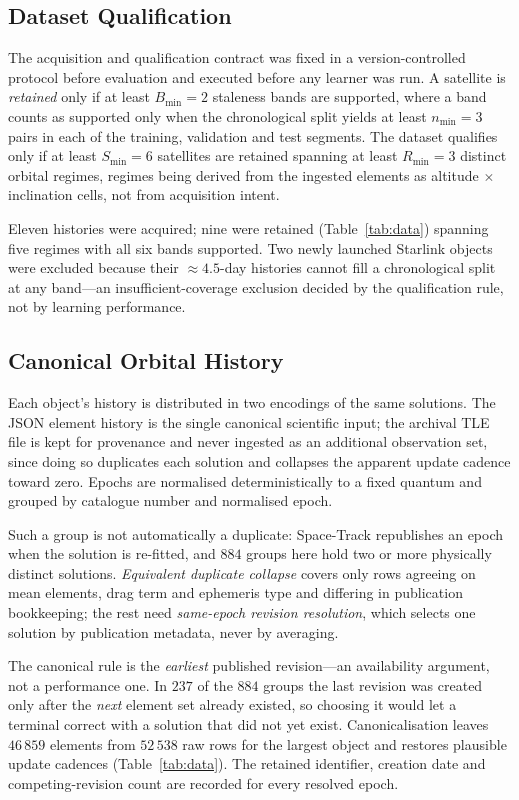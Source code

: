 \documentclass[conference]{IEEEtran}
\begin{document}
\subsection{Dataset Qualification}
\label{sec:qual}
The acquisition and qualification contract was fixed in a version-controlled
protocol before evaluation and executed before any learner was run. A satellite is \emph{retained} only if at least
$B_{\min}=2$ staleness bands are supported, where a band counts as supported
only when the chronological split yields at least $n_{\min}=3$ pairs in each of
the training, validation and test segments. The dataset qualifies only if at
least $S_{\min}=6$ satellites are retained spanning at least $R_{\min}=3$
distinct orbital regimes, regimes being derived from the ingested elements as
altitude$\,\times\,$inclination cells, not from acquisition intent.

Eleven histories were acquired; nine were retained (Table~\ref{tab:data})
spanning five regimes with all six bands supported. Two newly launched Starlink
objects were excluded because their $\approx4.5$-day histories cannot fill a
chronological split at any band---an insufficient-coverage exclusion decided by
the qualification rule, not by learning performance.

\subsection{Canonical Orbital History}
\label{sec:canonical}
Each object's history is distributed in two encodings of the same solutions. The
JSON element history is the single canonical scientific input; the archival TLE
file is kept for provenance and never ingested as an additional observation set,
since doing so duplicates each solution and collapses the apparent update cadence
toward zero. Epochs are normalised deterministically to a fixed quantum and
grouped by catalogue number and normalised epoch.

Such a group is not automatically a duplicate: Space-Track republishes an epoch
when the solution is re-fitted, and $884$ groups here hold two or more physically
distinct solutions. \emph{Equivalent duplicate collapse} covers only rows agreeing
on mean elements, drag term and ephemeris type and differing in publication
bookkeeping; the rest need \emph{same-epoch revision resolution}, which selects
one solution by publication metadata, never by averaging.

The canonical rule is the \emph{earliest} published revision---an availability
argument, not a performance one. In $237$ of the $884$ groups the last revision
was created only after the \emph{next} element set already existed, so choosing
it would let a terminal correct with a solution that did not yet exist.
Canonicalisation leaves $46\,859$ elements from $52\,538$ raw rows for the
largest object and restores plausible update cadences
(Table~\ref{tab:data}). The retained identifier, creation date and
competing-revision count are recorded for every resolved epoch.
\end{document}
